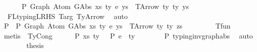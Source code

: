 \begin{isabellebody}
\ \ \ \ \ {\isasymGamma}\ {\isasymturnstile}{\isacharbraceleft}{\kern0pt}P{\isacharbraceright}{\kern0pt}\ Graph\ {\isacharparenleft}{\kern0pt}Atom\ {\isacharparenleft}{\kern0pt}GAbs\ xs\ ty{}\ e{\isacharparenright}{\kern0pt}\ ys{\isacharparenright}{\kern0pt}\ {\isacharcolon}{\kern0pt}\ TArrow\ ty{}\ ty{}\ ys{\isachardoublequoteclose}\isanewline
\ \ \ \ \ \ \isamarkupfalse%
\ {\isachardoublequoteopen}{}{\isachardoublequoteclose}{\isacharparenleft}{\kern0pt}{}{\isacharcomma}{\kern0pt}{}{\isacharcomma}{\kern0pt}{}{\isacharparenright}{\kern0pt}\ FL{\isacharunderscore}{\kern0pt}typing{\isacharunderscore}{\kern0pt}LRHS\ T{\isacharunderscore}{\kern0pt}arg\ TyArrow\ \isamarkupfalse%
\ auto\isanewline
\isanewline
\ \ \ \ \isamarkupfalse%
\ P{}{\isacharcolon}{\kern0pt}\ {\isachardoublequoteopen}{\isasymGamma}\ {\isasymturnstile}{\isacharbraceleft}{\kern0pt}P{\isacharbraceright}{\kern0pt}\ Graph\ {\isacharparenleft}{\kern0pt}Atom\ {\isacharparenleft}{\kern0pt}GAbs\ xs\ ty\ e{\isacharparenright}{\kern0pt}\ ys{\isacharparenright}{\kern0pt}\ {\isacharcolon}{\kern0pt}\ TArrow\ ty{}\ ty{}\ zs{\isachardoublequoteclose}\isanewline
\ \ \ \ \ \ \isamarkupfalse%
\ {\isachardoublequoteopen}{}{\isachardoublequoteclose}{\isacharparenleft}{\kern0pt}{}{\isacharparenright}{\kern0pt}\ T{\isacharunderscore}{\kern0pt}fun\isanewline
\ \ \ \ \ \ \isamarkupfalse%
\ {\isacharparenleft}{\kern0pt}metis\ {\isachardoublequoteopen}{}{\isachardoublequoteclose}{\isacharparenleft}{\kern0pt}{}{\isacharparenright}{\kern0pt}\ TyCong{\isacharparenright}{\kern0pt}\isanewline
\ \ \ \ \isamarkupfalse%
\ P{}{\isacharcolon}{\kern0pt}\ {\isachardoublequoteopen}{\isacharparenleft}{\kern0pt}xs{\isacharcomma}{\kern0pt}\ ty{}{\isacharparenright}{\kern0pt}\ {\isacharhash}{\kern0pt}\ {\isasymGamma}\ {\isasymturnstile}{\isacharbraceleft}{\kern0pt}P{\isacharbraceright}{\kern0pt}\ e\ {\isacharcolon}{\kern0pt}\ ty{}{\isachardoublequoteclose}\isanewline
\ \ \ \ \ \ \isamarkupfalse%
\ P{}\ typing{\isacharunderscore}{\kern0pt}inv{\isacharunderscore}{\kern0pt}graph{\isacharunderscore}{\kern0pt}abs\ \isamarkupfalse%
\ auto\isanewline
\ \ \ \ \isamarkupfalse%
\ \isamarkupfalse%
\ {\isacharquery}{\kern0pt}thesis\isanewline

\end{isabellebody}
